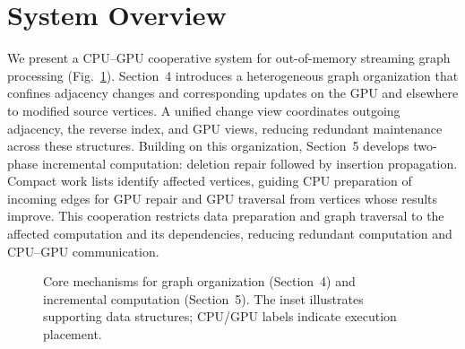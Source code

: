 
\section{System Overview}

We present a CPU--GPU cooperative system for out-of-memory streaming graph processing (Fig.~\ref{fig:1}). Section~4 introduces a heterogeneous graph organization that confines adjacency changes and corresponding updates on the GPU and elsewhere to modified source vertices. A unified change view coordinates outgoing adjacency, the reverse index, and GPU views, reducing redundant maintenance across these structures. Building on this organization, Section~5 develops two-phase incremental computation: deletion repair followed by insertion propagation. Compact work lists identify affected vertices, guiding CPU preparation of incoming edges for GPU repair and GPU traversal from vertices whose results improve. This cooperation restricts data preparation and graph traversal to the affected computation and its dependencies, reducing redundant computation and CPU--GPU communication.

\begin{figure}[t]
\centering
{}
\caption{Core mechanisms for graph organization (Section~4) and incremental computation (Section~5). The inset illustrates supporting data structures; CPU/GPU labels indicate execution placement.}
\label{fig:1}
\end{figure}

